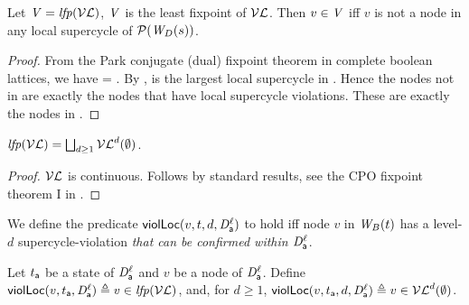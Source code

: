\begin{proposition} \label{prop:LFPisLocScViolations}
Let  $\VS= \lfp{\lVFs}$, \ie $\VS$ is the least fixpoint of $\lVFs$. Then $v \in \VS$ iff 
$v$ is not a node in any local supercycle of $\lwfgS{B}{s}{\DS}$.
\end{proposition}
%
\begin{proof}
From the Park conjugate (dual) fixpoint theorem in complete boolean lattices, we have 
\lfp{\VFs} = \compl{\gfp{\SFs}}.
By , \gfp{\SFs} is the largest local supercycle in . Hence the nodes not in 
\gfp{\SFs} are exactly the nodes that have local supercycle violations. These are exactly the nodes in \lfp{\VFs}.
\end{proof}



\begin{proposition} \label{prop:computeLocLFP}
$\lfp{\lVFs} = \JOIN_{d \ge 1} \lVFs^{d} (\ewfg)$.
\end{proposition}
%
\begin{proof}
$\lVFs$ is continuous. Follows by standard results, \eg see the CPO fixpoint theorem I in 
\cite{DP02}.
\end{proof}










We define the predicate $\lviol{v}{d}{t}{\act}{\l}$ to hold iff node $v$ in $\wfg{B}{t}$ has a level-$d$ supercycle-violation
\emph{that can be confirmed within $\dsk{\act}{\l}$}.

\begin{definition}
\label{def:supercycle.violation.local}
\label{defn:supercycle.violation.local}
Let $t_\act$ be a state of $\dsk{\act}{\l}$ and $v$ be a node of $\dsk{\act}{\l}$.
Define 
$\scVL{v}{t_\act}{\act}{\l} \df v \in \lfp{\lVFs}$,
and, for $d \ge 1$, $\scVLd{v}{d}{t_\act}{\act}{\l} \df v \in \lVFs^{d} (\ewfg)$.
\end{definition}



